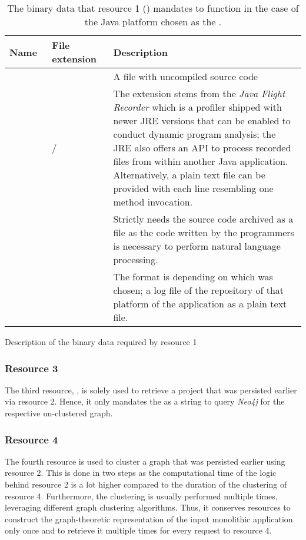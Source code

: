 \documentclass[12pt,a4paper]{report}
\begin{document}
\begin{table}[ht!]
\smaller
\def\arraystretch{1.55}
\begin{tabularx}{\textwidth}{|Y|Y|Y|}
 \hline
 Name~ & File extension~ & Description~ \\
 \hline\hline
          &  &
 A  file with uncompiled source code\\\hline
         &  /  &
 The  extension stems from the \textit{Java Flight Recorder} which is a profiler shipped with newer
 JRE versions that can be enabled to conduct dynamic program analysis; the JRE also offers an API to process
 recorded  files from within another Java application.
 Alternatively, a plain text file can be provided with each line resembling one method
 invocation. \\\hline
        &  &
 Strictly needs the source code archived as a  file as the code written by the programmers
 is necessary to perform natural language processing. \\\hline
    &  &
 The format is depending on which  was chosen; a log file of the repository of that platform of the application as a plain text file. \\\hline
\end{tabularx}
\caption{Description of the binary data required by resource 1}
\caption*{\centering
  The binary data that resource 1 () mandates to function
  in the case of the Java platform chosen as the .
}
\label{table:binary-data-resource-1}
\end{table}


\subsubsection{Resource 3}
The third resource, ,
is solely used to retrieve a project that was persisted
earlier via resource 2. Hence, it only mandates the  as a
string to query \textit{Neo4j} for the respective un\hyp clustered graph.


\subsubsection{Resource 4}
The fourth resource is used to cluster a graph that
was persisted earlier using resource 2. This is done in two steps as the
computational time of the logic behind resource 2 is a lot higher compared to
the duration of the clustering of resource 4. Furthermore, the clustering is
usually performed multiple times, leveraging different graph clustering
algorithms. Thus, it conserves resources to construct the graph-theoretic
representation of the input monolithic application only once and to retrieve it
multiple times for every request to resource 4.
\end{document}
